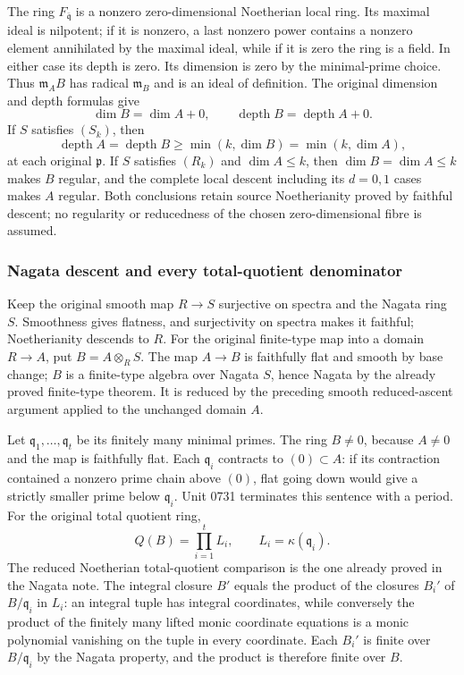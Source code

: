 The ring \(F_{\bar{\mathfrak q}}\) is a nonzero zero-dimensional Noetherian local ring. Its maximal ideal is nilpotent; if it is nonzero, a last nonzero power contains a nonzero element annihilated by the maximal ideal, while if it is zero the ring is a field. In either case its depth is zero. Its dimension is zero by the minimal-prime choice. Thus \(\mathfrak m_AB\) has radical \(\mathfrak m_B\) and is an ideal of definition. The original dimension and depth formulas give \[
 \dim B=\dim A+0,\qquad
 \operatorname{depth}B=\operatorname{depth}A+0.
\] If \(S\) satisfies \((S_k)\), then \[
 \operatorname{depth}A=\operatorname{depth}B
 \ge\min(k,\dim B)=\min(k,\dim A),
\] at each original \(\mathfrak p\). If \(S\) satisfies \((R_k)\) and \(\dim A\le k\), then \(\dim B=\dim A\le k\) makes \(B\) regular, and the complete local descent including its \(d=0,1\) cases makes \(A\) regular. Both conclusions retain source Noetherianity proved by faithful descent; no regularity or reducedness of the chosen zero-dimensional fibre is assumed.

\subsubsection{Nagata descent and every total-quotient denominator}\label{algebra-proof-069-nagata-descent-and-every-total-quotient-denominator}

Keep the original smooth map \(R\to S\) surjective on spectra and the Nagata ring \(S\). Smoothness gives flatness, and surjectivity on spectra makes it faithful; Noetherianity descends to \(R\). For the original finite-type map into a domain \(R\to A\), put \(B=A\otimes_RS\). The map \(A\to B\) is faithfully flat and smooth by base change; \(B\) is a finite-type algebra over Nagata \(S\), hence Nagata by the already proved finite-type theorem. It is reduced by the preceding smooth reduced-ascent argument applied to the unchanged domain \(A\).

Let \(\mathfrak q_1,\ldots,\mathfrak q_t\) be its finitely many minimal primes. The ring \(B\ne0\), because \(A\ne0\) and the map is faithfully flat. Each \(\mathfrak q_i\) contracts to \((0)\subset A\): if its contraction contained a nonzero prime chain above \((0)\), flat going down would give a strictly smaller prime below \(\mathfrak q_i\). Unit 0731 terminates this sentence with a period. For the original total quotient ring, \[
 Q(B)=\prod_{i=1}^t L_i,\qquad L_i=\kappa(\mathfrak q_i).
\] The reduced Noetherian total-quotient comparison is the one already proved in the Nagata note. The integral closure \(B'\) equals the product of the closures \(B_i'\) of \(B/\mathfrak q_i\) in \(L_i\): an integral tuple has integral coordinates, while conversely the product of the finitely many lifted monic coordinate equations is a monic polynomial vanishing on the tuple in every coordinate. Each \(B_i'\) is finite over \(B/\mathfrak q_i\) by the Nagata property, and the product is therefore finite over \(B\).

